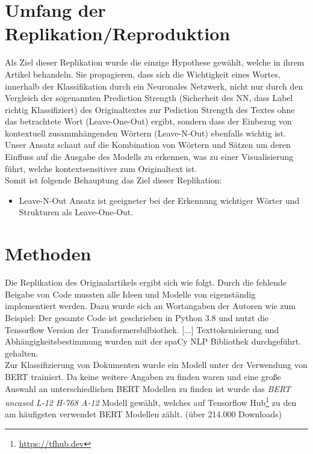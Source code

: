 \documentclass[DIV=13,fontsize=11pt]{scrartcl}
\begin{document}
\section{Umfang der Replikation/Reproduktion}

Als Ziel dieser Replikation wurde die einzige Hypothese gewählt, welche
\citeauthor{dunn2021context} in ihrem Artikel behandeln. Sie propagieren,
dass sich die Wichtigkeit eines Wortes, innerhalb der Klassifikation durch ein
Neuronales Netzwerk, nicht nur durch den Vergleich der sogenannten
Prediction Strength (Sicherheit des NN, dass Label richtig Klassifiziert)
des Originaltextes zur Pediction Strength des Textes ohne das betrachtete Wort (Leave-One-Out)
ergibt, sondern dass der Einbezug von kontextuell zusammhängenden Wörtern (Leave-N-Out)
ebenfalls wichtig ist. \glqq Unser Ansatz schaut auf die Kombination von
Wörtern und Sätzen um deren Einfluss auf die Ausgabe des Modells zu erkennen,
was zu einer Visualisierung führt, welche kontextsensitiver zum Originaltext ist.
\grqq~\cite{dunn2021context}\\

Somit ist folgende Behauptung das Ziel dieser Replikation:

\begin{itemize}
    \item Leave-N-Out Ansatz ist geeigneter bei der Erkennung wichtiger Wörter und Strukturen als Leave-One-Out.
\end{itemize}

\section{Methoden}

Die Replikation des Originalartikels ergibt sich wie folgt. Durch die
fehlende Beigabe von Code mussten alle Ideen und Modelle von \citeauthor{dunn2021context}
eigenständig implementiert werden. Dazu wurde sich an Wortangaben
der Autoren wie zum Beispiel:
\glqq Der gesamte Code ist geschrieben in Python 3.8 und nutzt die Tensorflow Version
der Transformersbilbiothek. [...] Texttokenisierung und Abhängigkeitsbestimmung wurden
mit der spaCy NLP Bibliothek durchgeführt.\grqq~\cite{dunn2021context} gehalten.\\

Zur Klassifizierung von Dokumenten wurde ein Modell unter der Verwendung von BERT trainiert.
Da keine weitere Angaben zu finden waren und eine große Auswahl an unterschiedlichen
BERT Modellen zu finden ist wurde das \textit{BERT uncased L-12 H-768 A-12} Modell gewählt,
welches auf Tensorflow Hub\footnote{\url{https://tfhub.dev}} zu den am häufigsten verwendet
BERT Modellen zählt. (über 214.000 Downloads)\\
\end{document}
